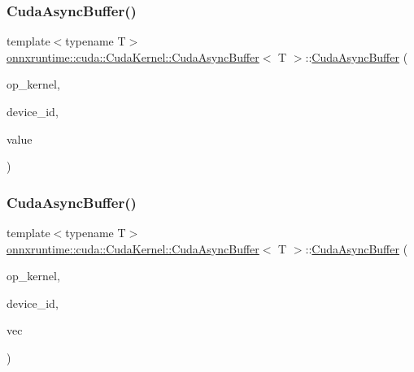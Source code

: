 \subsubsection{\texorpdfstring{Cuda\+Async\+Buffer()}{CudaAsyncBuffer()}\hspace{0.1cm}{\footnotesize\ttfamily [3/4]}}
{\footnotesize\ttfamily template$<$typename T$>$ \\
\mbox{\hyperlink{classonnxruntime_1_1cuda_1_1CudaKernel_1_1CudaAsyncBuffer}{onnxruntime\+::cuda\+::\+Cuda\+Kernel\+::\+Cuda\+Async\+Buffer}}$<$ T $>$\+::\mbox{\hyperlink{classonnxruntime_1_1cuda_1_1CudaKernel_1_1CudaAsyncBuffer}{Cuda\+Async\+Buffer}} (\begin{DoxyParamCaption}\item[{const \mbox{\hyperlink{classonnxruntime_1_1cuda_1_1CudaKernel}{Cuda\+Kernel}} $\ast$}]{op\+\_\+kernel,  }\item[{int}]{device\+\_\+id,  }\item[{const T \&}]{value }\end{DoxyParamCaption})\hspace{0.3cm}{\ttfamily [inline]}}

\mbox{\label{classonnxruntime_1_1cuda_1_1CudaKernel_1_1CudaAsyncBuffer_a97550222aa391beebc4b990dc543b7d6}} 
\subsubsection{\texorpdfstring{Cuda\+Async\+Buffer()}{CudaAsyncBuffer()}\hspace{0.1cm}{\footnotesize\ttfamily [4/4]}}
{\footnotesize\ttfamily template$<$typename T$>$ \\
\mbox{\hyperlink{classonnxruntime_1_1cuda_1_1CudaKernel_1_1CudaAsyncBuffer}{onnxruntime\+::cuda\+::\+Cuda\+Kernel\+::\+Cuda\+Async\+Buffer}}$<$ T $>$\+::\mbox{\hyperlink{classonnxruntime_1_1cuda_1_1CudaKernel_1_1CudaAsyncBuffer}{Cuda\+Async\+Buffer}} (\begin{DoxyParamCaption}\item[{const \mbox{\hyperlink{classonnxruntime_1_1cuda_1_1CudaKernel}{Cuda\+Kernel}} $\ast$}]{op\+\_\+kernel,  }\item[{int}]{device\+\_\+id,  }\item[{const std\+::vector$<$ T $>$ \&}]{vec }\end{DoxyParamCaption})\hspace{0.3cm}{\ttfamily [inline]}}



